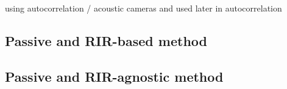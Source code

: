 using autocorrelation / acoustic cameras
 and used later in 
autocorrelation 


\subsection{Passive and RIR-based method}



\subsection{Passive and RIR-agnostic method}


